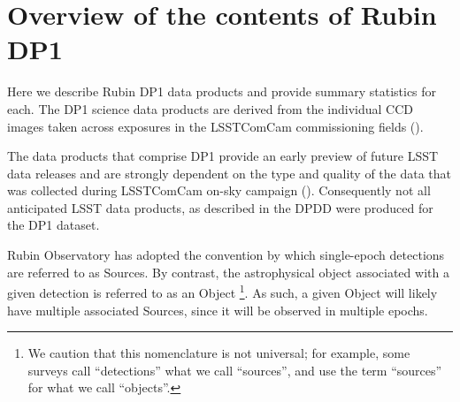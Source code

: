  \graphicspath{{./}{figures/data_products}}
\section{Overview of the contents of Rubin DP1
\label{sec:data_products}}

Here we describe Rubin \gls{DP1} data products and provide summary statistics for each.
The \gls{DP1} science data products are derived from the \nvisitimages individual \gls{CCD} images taken across \nexposures exposures in the \nfields \gls{LSSTComCam} commissioning fields ().

The data products that comprise \gls{DP1} provide an early preview of future LSST data releases and are strongly dependent on the type and quality of the data that was collected during \gls{LSSTComCam} on-sky campaign ().
Consequently not all anticipated  \gls{LSST} data products, as described in the \gls{DPDD} \citep{LSE-163} were produced for the \gls{DP1} dataset.

Rubin Observatory has adopted the convention by which single-epoch detections are referred to as Sources.
By contrast, the astrophysical object associated with a given detection is referred to as an Object
\footnote{We caution that this nomenclature is not universal; for example, some surveys call ``detections'' what we call ``sources'', and use the term ``sources'' for what we call ``objects''.}.
As such, a given Object will likely have multiple associated  Sources, since it will be observed in multiple epochs.

